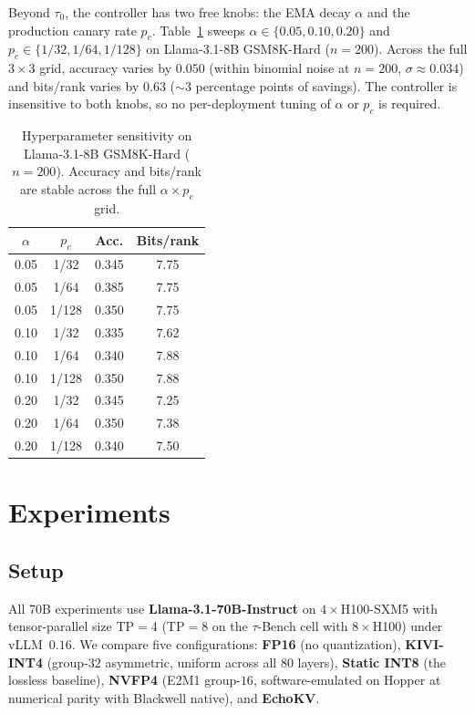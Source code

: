 \documentclass{article}
\begin{document}
Beyond $\tau_0$, the controller has two free knobs: the EMA decay
$\alpha$ and the production canary rate $p_c$. Table~\ref{tab:ablation}
sweeps $\alpha \in \{0.05, 0.10, 0.20\}$ and $p_c \in \{1/32, 1/64,
1/128\}$ on Llama-3.1-8B GSM8K-Hard ($n{=}200$). Across the full $3{\times}3$
grid, accuracy varies by $0.050$ (within binomial noise at $n{=}200$,
$\sigma{\approx}0.034$) and bits/rank varies by $0.63$ (${\sim}3$ percentage
points of savings). The controller is insensitive to both knobs, so no
per-deployment tuning of $\alpha$ or $p_c$ is required.

\begin{table}[h]
\centering
\caption{Hyperparameter sensitivity on Llama-3.1-8B GSM8K-Hard ($n{=}200$).
  Accuracy and bits/rank are stable across the full $\alpha \times p_c$ grid.}
\label{tab:ablation}
\small
\begin{tabular}{cccc}
\toprule
$\alpha$ & $p_c$ & Acc. & Bits/rank \\
\midrule
0.05 & 1/32  & 0.345 & 7.75 \\
0.05 & 1/64  & 0.385 & 7.75 \\
0.05 & 1/128 & 0.350 & 7.75 \\
0.10 & 1/32  & 0.335 & 7.62 \\
0.10 & 1/64  & 0.340 & 7.88 \\
0.10 & 1/128 & 0.350 & 7.88 \\
0.20 & 1/32  & 0.345 & 7.25 \\
0.20 & 1/64  & 0.350 & 7.38 \\
0.20 & 1/128 & 0.340 & 7.50 \\
\bottomrule
\end{tabular}
\end{table}

\section{Experiments}
\label{sec:experiments}

\subsection{Setup}
\label{sec:setup}

All 70B experiments use \textbf{Llama-3.1-70B-Instruct} on $4\!\times$H100-SXM5
with tensor-parallel size TP$=$4 (TP$=$8 on the $\tau$-Bench cell with
$8\!\times$H100) under vLLM~$0.16$. We compare five configurations:
\textbf{FP16} (no quantization), \textbf{KIVI-INT4} (group-$32$ asymmetric,
uniform across all $80$ layers), \textbf{Static INT8} (the lossless
baseline), \textbf{NVFP4} (E2M1 group-$16$, software-emulated on Hopper at
numerical parity with Blackwell native), and \textbf{EchoKV}.
\end{document}
